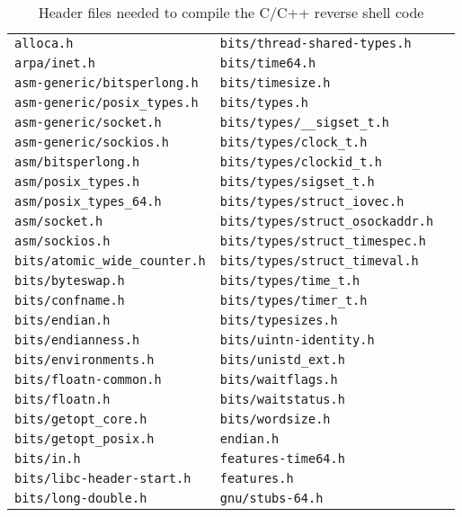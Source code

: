 \begin{longtable}{l l l }
\caption{Header files needed to compile the C/C++ reverse shell code}\label{tab:c-dpd-include} \\
\texttt{alloca.h} & \texttt{bits/thread-shared-types.h} \\
\texttt{arpa/inet.h} & \texttt{bits/time64.h} \\
\texttt{asm-generic/bitsperlong.h} & \texttt{bits/timesize.h} \\
\texttt{asm-generic/posix\_types.h} & \texttt{bits/types.h} \\
\texttt{asm-generic/socket.h} & \texttt{bits/types/\_\_sigset\_t.h} \\
\texttt{asm-generic/sockios.h} & \texttt{bits/types/clock\_t.h} \\
\texttt{asm/bitsperlong.h} & \texttt{bits/types/clockid\_t.h} \\
\texttt{asm/posix\_types.h} & \texttt{bits/types/sigset\_t.h} \\
\texttt{asm/posix\_types\_64.h} & \texttt{bits/types/struct\_iovec.h} \\
\texttt{asm/socket.h} & \texttt{bits/types/struct\_osockaddr.h} \\
\texttt{asm/sockios.h} & \texttt{bits/types/struct\_timespec.h} \\
\texttt{bits/atomic\_wide\_counter.h} & \texttt{bits/types/struct\_timeval.h} \\
\texttt{bits/byteswap.h} & \texttt{bits/types/time\_t.h} \\
\texttt{bits/confname.h} & \texttt{bits/types/timer\_t.h} \\
\texttt{bits/endian.h} & \texttt{bits/typesizes.h} \\
\texttt{bits/endianness.h} & \texttt{bits/uintn-identity.h} \\
\texttt{bits/environments.h} & \texttt{bits/unistd\_ext.h} \\
\texttt{bits/floatn-common.h} & \texttt{bits/waitflags.h} \\
\texttt{bits/floatn.h} & \texttt{bits/waitstatus.h} \\
\texttt{bits/getopt\_core.h} & \texttt{bits/wordsize.h} \\
\texttt{bits/getopt\_posix.h} & \texttt{endian.h} \\
\texttt{bits/in.h} & \texttt{features-time64.h} \\
\texttt{bits/libc-header-start.h} & \texttt{features.h} \\
\texttt{bits/long-double.h} & \texttt{gnu/stubs-64.h} \\

\end{longtable}

